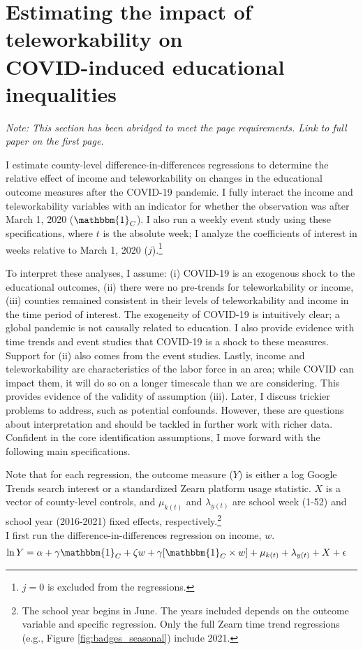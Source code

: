 \section{Estimating the impact of teleworkability on \\ COVID-induced educational inequalities}
\if{}
{\small
    \textit{Note: This section has been abridged to meet the page requirements. Link to full paper on the first page.}
}
\fi

I estimate county-level difference-in-differences regressions to determine the relative effect of income and teleworkability on changes in the educational outcome measures after the COVID-19 pandemic.
I fully interact the income and teleworkability variables with an indicator for whether the observation was after March 1, 2020 ($\mathbbm{1}_C$).
I also run a weekly event study using these specifications, where $t$ is the absolute week; I analyze the coefficients of interest in weeks relative to March 1, 2020 ($j$).\footnote{$j=0$ is excluded from the regressions.}

To interpret these analyses, I assume: (i) COVID-19 is an exogenous shock to the educational outcomes, (ii) there were no pre-trends for teleworkability or income, (iii) counties remained consistent in their levels of teleworkability and income in the time period of interest.
The exogeneity of COVID-19 is intuitively clear; a global pandemic is not
causally related to education.
I also provide evidence with time trends and event studies that COVID-19 is a shock to these measures.
Support for (ii) also comes from the event studies.
Lastly, income and teleworkability are characteristics of the labor force in an area;
while COVID can impact them, it will do so on a longer timescale than we are considering.
This provides evidence of the validity of assumption (iii).
Later, I discuss trickier problems to address, such as potential confounds.
However, these are questions about interpretation and should be tackled in further work with richer data.
Confident in the core identification assumptions, I move forward
with the following main specifications.

Note that for each regression, the outcome measure ($Y$) is either a log Google Trends search interest or a standardized Zearn platform usage statistic.
$X$ is a vector of county-level controls, and $\mu_{k(t)}$ and $\lambda_{y(t)}$ are school week (1-52) and school year (2016-2021) fixed effects, respectively.\footnote{The school year begins in June. The years included depends on the outcome variable and specific regression. Only the full Zearn time trend regressions (e.g., Figure \ref{fig:badges_seasonal}) include 2021.} \\
I first run the difference-in-differences regression on income, $w$.
\begin{align} \label{incalone}
    \ln Y &=  \alpha + \gamma \mathbbm{1}_{C} + \zeta w  + \gamma [\mathbbm{1}_C\times w] + \mu_{k\left(t\right)}+\lambda_{y\left(t\right)}+ X + \epsilon
\end{align}

